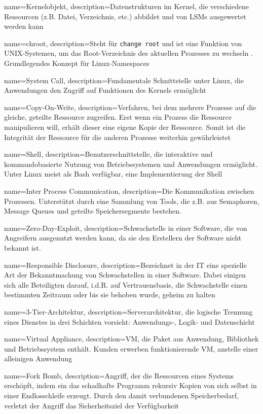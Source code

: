 {%
  name={Kernelobjekt},
  description={Datenstrukturen im Kernel, die verschiedene Ressourcen (z.B. Datei, Verzeichnis, etc.) abbildet und von LSMs ausgewertet werden kann \cite{kernelObjects}}
}

{%
  name={chroot},
  description={Steht für \texttt{change root} und ist eine Funktion von UNIX-Systemen, um das Root-Verzeichnis des aktuellen Prozesses zu wechseln \cite{chroot}. Grundlegendes Konzept für Linux-Namespaces}
}

{%
  name={System Call},
  description={Fundamentale Schnittstelle unter Linux, die Anwendungen den Zugriff auf Funktionen des Kernels ermöglicht \cite{systemcall}}
}

{%
  name={Copy-On-Write},
  description={Verfahren, bei dem mehrere Prozesse auf die gleiche, geteilte Ressource zugreifen. Erst wenn ein Prozess die Ressource manipulieren will, erhält dieser eine eigene Kopie der Ressource. Somit ist die Integrität der Ressource für die anderen Prozesse weiterhin gewährleistet \cite{dockerImagesAndContainers}}
}

{%
  name={Shell},
  description={Benutzerschnittstelle, die interaktive und kommandobasierte Nutzung von Betriebssystemen und Anwendungen ermöglicht. Unter Linux meist als Bash verfügbar, eine Implementierung der Shell}
}

{%
  name={Inter Process Communication},
  description={Die Kommunikation zwischen Prozessen. Unterstützt durch eine Sammlung von Tools, die z.B. aus Semaphoren, Message Queues und geteilte Speichersegmente bestehen.}
}


{%
  name={Zero-Day-Exploit},
  description={Schwachstelle in einer Software, die von Angreifern ausgenutzt werden kann, da sie den Erstellern der Software nicht bekannt ist.}
}

{%
  name={Responsible Disclosure},
  description={Bezeichnet in der IT eine spezielle Art der Bekanntmachung von Schwachstellen in einer Software. Dabei einigen sich alle Beteiligten darauf, i.d.R. auf Vertrauensbasis, die Schwachstelle einen bestimmten Zeitraum oder bis sie behoben wurde, geheim zu halten}
}

{%
  name={3-Tier-Architektur},
  description={Serverarchitektur, die logische Trennung eines Dienstes in drei Schichten vorsieht: Anwendungs-, Logik- und Datenschicht}
}

{%
  name={Virtual Appliance},
  description={VM, die Paket aus Anwendung, Bibliothek und Betriebssystem enthält. Kunden erwerben funktionierende VM, anstelle einer alleinigen Anwendung \cite[S.672f.]{tanenbaumOS}}
}

{%
  name={Fork Bomb},
  description={Angriff, der die Ressourcen eines Systems erschöpft, indem ein das schadhafte Programm rekursiv Kopien von sich selbst in einer Endlosschleife erzeugt. Durch den damit verbundenen Speicherbedarf, verletzt der Angriff das Sicherheitsziel der Verfügbarkeit}
}
